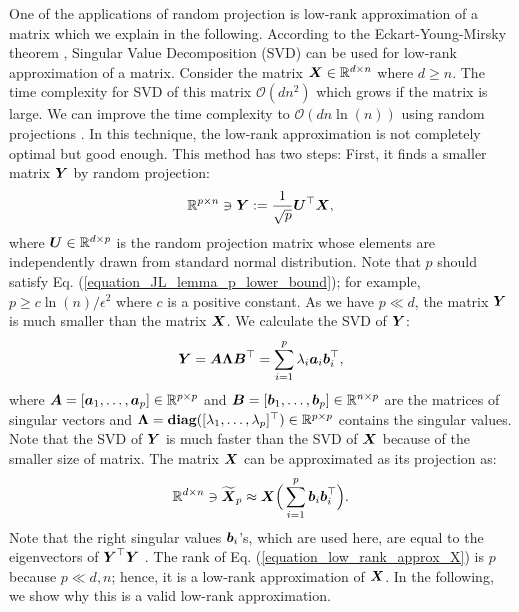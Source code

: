 \documentclass{article}
\def\b{\ensuremath\boldsymbol}
\begin{document}
One of the applications of random projection is low-rank approximation of a matrix which we explain in the following.
According to the Eckart-Young-Mirsky theorem \cite{eckart1936approximation}, Singular Value Decomposition (SVD) can be used for low-rank approximation of a matrix. Consider the matrix $\b{X} \in \mathbb{R}^{d \times n}$ where $d \geq n$. 
The time complexity for SVD of this matrix $\mathcal{O}(d n^2)$ which grows if the matrix is large. We can improve the time complexity to $\mathcal{O}(d n \ln(n))$ using random projections \cite{papadimitriou2000latent}. In this technique, the low-rank approximation is not completely optimal but good enough. 
This method has two steps: First, it finds a smaller matrix $\b{Y}$ by random projection:
\begin{align}\label{equation_lowRankApprox_Y_projection}
\mathbb{R}^{p \times n} \ni \b{Y} := \frac{1}{\sqrt{p}} \b{U}^\top \b{X},
\end{align}
where $\b{U} \in \mathbb{R}^{d \times p}$ is the random projection matrix whose elements are independently drawn from standard normal distribution. Note that $p$ should satisfy Eq. (\ref{equation_JL_lemma_p_lower_bound}); for example, $p \geq c \ln(n) / \epsilon^2$ where $c$ is a positive constant.
As we have $p \ll d$, the matrix $\b{Y}$ is much smaller than the matrix $\b{X}$. We calculate the SVD of $\b{Y}$:
\begin{align}\label{equation_lowRankApprox_Y}
\b{Y} = \b{A} \b{\Lambda} \b{B}^\top = \sum_{i=1}^p \lambda_i \b{a}_i \b{b}_i^\top,
\end{align}
where $\b{A} = [\b{a}_1, \dots, \b{a}_p] \in \mathbb{R}^{p \times p}$ and $\b{B} = [\b{b}_1, \dots, \b{b}_p] \in \mathbb{R}^{n \times p}$ are the matrices of singular vectors and $\b{\Lambda} = \textbf{diag}([\lambda_1, \dots, \lambda_p]^\top) \in \mathbb{R}^{p \times p}$ contains the singular values. 
Note that the SVD of $\b{Y}$ is much faster than the SVD of $\b{X}$ because of the smaller size of matrix. 
The matrix $\b{X}$ can be approximated as its projection as:
\begin{align}\label{equation_low_rank_approx_X}
\mathbb{R}^{d \times n} \ni \widetilde{\b{X}}_p \approx \b{X} \Big(\sum_{i=1}^p \b{b}_i \b{b}_i^\top\Big).
\end{align}
Note that the right singular values $\b{b}_i$'s, which are used here, are equal to the eigenvectors of $\b{Y}^\top \b{Y}$ \cite{ghojogh2019unsupervised}. 
The rank of Eq. (\ref{equation_low_rank_approx_X}) is $p$ because $p \ll d, n$; hence, it is a low-rank approximation of $\b{X}$. 
In the following, we show why this is a valid low-rank approximation.
\end{document}
